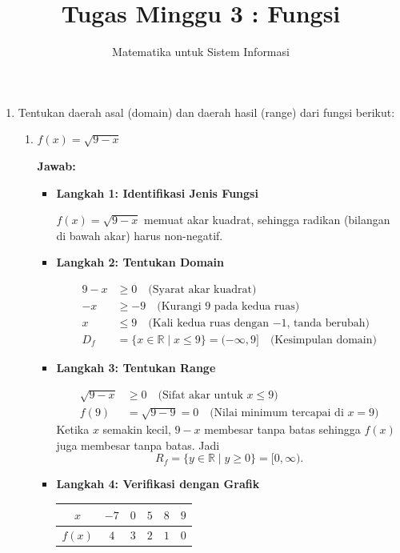 \documentclass[10pt,a4paper]{article}
\title{Tugas Minggu 3 : Fungsi}
\author{Matematika untuk Sistem Informasi}
\date{}
\newcounter{eqblock}
\newcommand{\reseteq}{%
  \stepcounter{eqblock}%
  \setcounter{equation}{0}%
  \renewcommand{\theHequation}{\arabic{eqblock}.\arabic{equation}}%
}
\begin{document}
\maketitle

\begin{enumerate}

\item Tentukan daerah asal (domain) dan daerah hasil (range) dari fungsi berikut:
\begin{enumerate}

\item $f(x) = \sqrt{9 - x}$

\textbf{Jawab:}
\begin{itemize}
\item \textbf{Langkah 1: Identifikasi Jenis Fungsi}

$f(x) = \sqrt{9 - x}$ memuat akar kuadrat, sehingga radikan (bilangan di bawah akar) harus non-negatif.

\item \textbf{Langkah 2: Tentukan Domain}

\reseteq
\begin{align}
9 - x &\geq 0 \quad \text{(Syarat akar kuadrat)} \\
-x &\geq -9 \quad \text{(Kurangi 9 pada kedua ruas)} \\
x &\leq 9 \quad \text{(Kali kedua ruas dengan $-1$, tanda berubah)} \\
D_f &= \{x \in \mathbb{R} \mid x \leq 9\} = (-\infty, 9] \quad \text{(Kesimpulan domain)}
\end{align}

\item \textbf{Langkah 3: Tentukan Range}

\reseteq
\begin{align}
\sqrt{9 - x} &\geq 0 \quad \text{(Sifat akar untuk $x \leq 9$)} \\
f(9) &= \sqrt{9 - 9} = 0 \quad \text{(Nilai minimum tercapai di $x = 9$)}
\end{align}
Ketika $x$ semakin kecil, $9 - x$ membesar tanpa batas sehingga $f(x)$ juga membesar tanpa batas. Jadi
\[
R_f = \{y \in \mathbb{R} \mid y \geq 0\} = [0, \infty).
\]

\item \textbf{Langkah 4: Verifikasi dengan Grafik}

\begin{center}
\begin{tabular}{c|ccccc}
$x$ & $-7$ & $0$ & $5$ & $8$ & $9$ \\ \hline
$f(x)$ & $4$ & $3$ & $2$ & $1$ & $0$
\end{tabular}
\end{center}


\end{itemize}
\end{enumerate}
\end{enumerate}
\end{document}
